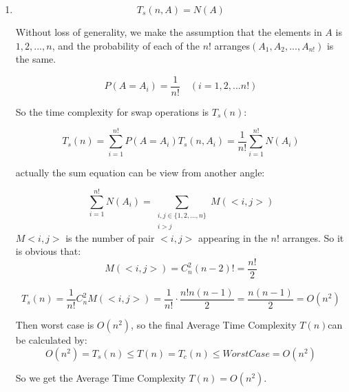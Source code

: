 \documentclass[12pt,a4paper]{article}
\makeatletter
\newtheorem*{solution}{Solution}
\theoremstyle{definition}
\renewenvironment{solution}[1][Solution] {\par\pushQED{\qed}\normalfont\topsep6\p@\@plus6\p@\relax\trivlist\item[\hskip\labelsep\bfseries#1\@addpunct{.}]\ignorespaces}{\popQED\endtrivlist\@endpefalse} \makeatother
\makeatother
\begin{document}
\begin{enumerate}
\begin{solution}
    \begin{equation*}
        T_s(n, A) = N(A)
    \end{equation*}

    Without loss of generality, we make the assumption that the elements in $A$ is $1, 2,..., n$, and the probability of each of the $n!$ arranges$(A_1, A_2, ..., A_{n!})$ is the same.
   
    \begin{equation*}
        P(A =A_i) = \frac{1}{n!} \quad (i=1, 2, ... n!)
    \end{equation*}

    So the time complexity for swap operations is $T_s(n)$:

    \begin{equation*}
        T_s(n) = \sum_{i = 1}^{n!}P(A=A_i)T_s(n, A_i) = \frac{1}{n!}\sum_{i = 1}^{n!}N(A_i) 
    \end{equation*}

    actually the sum equation can be view from another angle:

    \begin{equation*}
        \sum_{i = 1}^{n!}N(A_i) = \sum_{\substack{i, j \in \{1, 2, ..., n\}\\ i > j }}M(<i, j>) 
    \end{equation*}
    $M<i, j>$ is the number of pair $<i, j>$ appearing in the $n!$ arranges. So it is obvious that:
    \begin{equation*}
        M(<i, j>) = C_n^{2}(n-2)!=\frac{n!}{2}
    \end{equation*}

    \begin{equation*}
        T_s(n) = \frac{1}{n!}  C_n^{2} M(<i, j>) = \frac{1}{n!}\cdot\frac{n!n(n - 1)}{2} = \frac{n(n - 1)}{2} = O(n^2)
    \end{equation*}

    Then worst case is $O(n^2)$, so the final Average Time Complexity $T(n)$can be calculated by:
    \begin{equation*}
            O(n^2) = T_s(n) \leq T(n) = T_c(n) \leq WorstCase = O(n^2)
    \end{equation*}

    So we get the Average Time Complexity $T(n) = O(n^2)$.



    












\end{solution}
\end{enumerate}
\end{document}
